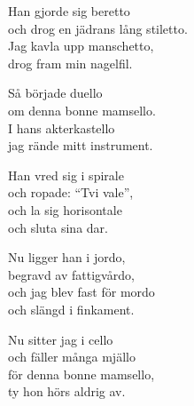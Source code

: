 \vspace{10pt}
Han gjorde sig beretto\\
och drog en jädrans lång stiletto.\\
Jag kavla upp manschetto,\\
drog fram min nagelfil.\par
\vspace{10pt}
Så började duello\\
om denna bonne mamsello.\\
I hans akterkastello\\
jag rände mitt instrument.\par
\vspace{10pt}
Han vred sig i spirale\\
och ropade: ``Tvi vale'',\\
och la sig horisontale\\
och sluta sina dar.\par
\vspace{10pt}
Nu ligger han i jordo,\\
begravd av fattigvårdo,\\
och jag blev fast för mordo\\
och slängd i finkament.\par
\vspace{10pt}
Nu sitter jag i cello\\
och fäller många mjällo\\
för denna bonne mamsello,\\
ty hon hörs aldrig av.
